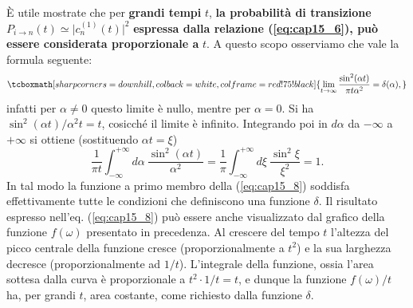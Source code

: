 È utile mostrate che per \textbf{grandi tempi} $t$, \textbf{la probabilità di transizione} $P_{i\rightarrow n} (t) \simeq \vert c_n ^{(1)} (t) \vert ^2$ \textbf{espressa dalla relazione (\ref{eq:cap15_6}), può essere considerata proporzionale a } $t$. A questo scopo osserviamo che vale la formula seguente:
	\begin{equation}
		\tcboxmath[sharp corners=downhill, colback=white, colframe=red!75!black]{
			\lim _{t \rightarrow \infty} \frac{\sin ^2 (\alpha t)}{\pi t \alpha ^2} = \delta (\alpha),
			}
	\label{eq:cap15_8}
	\end{equation}
infatti per $\alpha \neq 0$ questo limite è nullo, mentre per  $\alpha = 0$. Si ha $\sin ^2 (\alpha t)/\alpha ^2 t = t$, cosicché il limite è infinito. Integrando poi in $d \alpha$ da $-\infty$ a $+\infty$ si ottiene (sostituendo $\alpha t = \xi$)
	\begin{equation}
		\frac{1}{\pi t}\int _{-\infty} ^{+\infty} d\alpha \ \frac{\sin ^2 (\alpha t)}{ \alpha ^2} = \frac{1}{\pi}\int _{-\infty} ^{+\infty} d\xi \ \frac{\sin ^2 \xi}{ \xi ^2}=1. 
	\end{equation}
In tal modo la funzione a primo membro della (\ref{eq:cap15_8}) soddisfa effettivamente tutte le condizioni che definiscono una funzione $\delta$. Il risultato espresso nell'eq. (\ref{eq:cap15_8}) può essere anche visualizzato dal grafico della funzione $f(\omega)$ presentato in precedenza. Al crescere del tempo $t$ l'altezza del picco centrale della funzione cresce (proporzionalmente a $t^2$) e la sua larghezza decresce (proporzionalmente ad $1/t$). L'integrale della funzione, ossia l'area sottesa dalla curva è proporzionale a $t^2\cdot 1/t =t$, e dunque la funzione $f(\omega)/t$ ha, per grandi $t$, area costante, come richiesto dalla funzione $\delta$.\\

